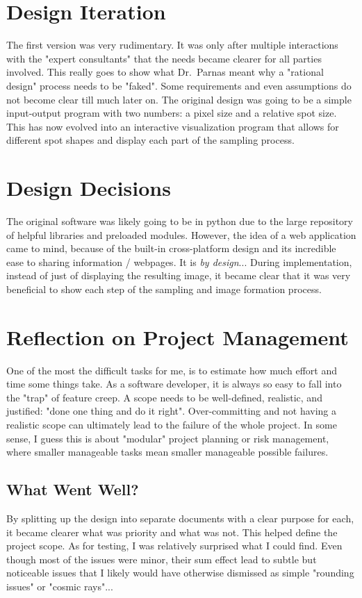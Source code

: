 \documentclass{article}
\begin{document}
\section{Design Iteration}
The first version was very rudimentary. It was only after multiple interactions
with the "expert consultants" that the needs became clearer for all parties involved.
This really goes to show what Dr.~Parnas meant why a "rational design" process
needs to be "faked". Some requirements and even assumptions do not become clear
till much later on. The original design was going to be a simple input-output
program with two numbers: a pixel size and a relative spot size. This has now
evolved into an interactive visualization program that allows for different
spot shapes and display each part of the sampling process.

\section{Design Decisions}
The original software was likely going to be in python due to the large
repository of helpful libraries and preloaded modules.
However, the idea of a web application came to mind, because of the
built-in cross-platform design and its incredible
ease to sharing information / webpages.
It is \textit{by design}...
During implementation, instead of just of displaying the resulting image,
it became clear that it was very beneficial
to show each step of the sampling and image formation process.

\section{Reflection on Project Management}
One of the most the difficult tasks for me, is to estimate how much effort and time
some things take. As a software developer, it is always so easy to fall into the 
"trap" of feature creep. A scope needs to be well-defined, realistic, and justified:
"done one thing and do it right". Over-committing and not having a realistic 
scope can ultimately lead to the failure of the whole project. In some sense,
I guess this is about "modular" project planning or risk management,
where smaller manageable tasks mean smaller manageable possible failures.

\subsection{What Went Well?}
By splitting up the design into separate documents with a clear purpose for each,
it became clearer what was priority and what was not. This helped define the
project scope. As for testing, I was relatively surprised what I could find.
Even though most of the issues were minor, their sum effect lead to subtle
but noticeable issues that I likely would have otherwise dismissed as
simple "rounding issues" or "cosmic rays"...
\end{document}
